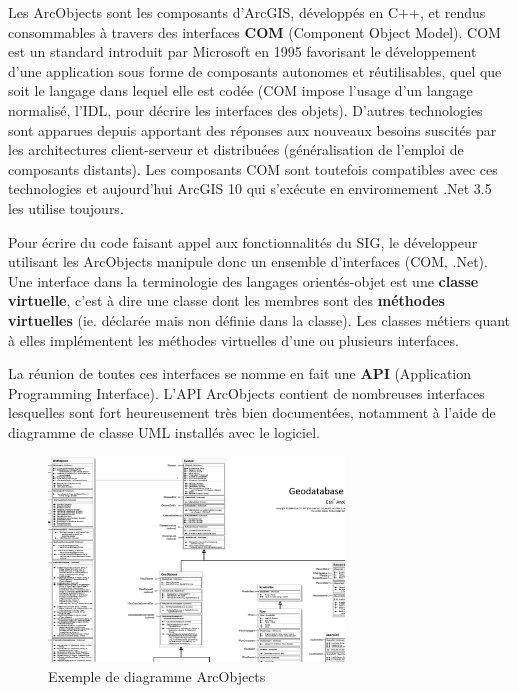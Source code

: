 \documentclass[11pt]{article}
\begin{document}
Les ArcObjects sont les composants d'ArcGIS, développés en C++, et rendus consommables à travers des interfaces \textbf{COM} (Component Object Model). COM est un standard introduit par Microsoft en 1995 favorisant le développement d'une application sous forme de composants autonomes et réutilisables, quel que soit le langage dans lequel elle est codée (COM impose l'usage d'un langage normalisé, l'IDL, pour décrire les interfaces des objets). D'autres technologies sont apparues depuis apportant des réponses aux nouveaux besoins suscités par les architectures client-serveur et distribuées (généralisation de l'emploi de composants distants). Les composants COM sont toutefois compatibles avec ces technologies et aujourd'hui ArcGIS 10 qui s'exécute en environnement .Net 3.5 les utilise toujours.

Pour écrire du code faisant appel aux fonctionnalités du SIG, le développeur utilisant les ArcObjects manipule donc un ensemble d'interfaces (COM, .Net). Une interface dans la terminologie des langages orientés-objet est une \textbf{classe virtuelle}, c'est à dire une classe dont les membres sont des \textbf{méthodes virtuelles} (ie. déclarée mais non définie dans la classe). Les classes métiers quant à elles implémentent les méthodes virtuelles d'une ou plusieurs interfaces.

La réunion de toutes ces interfaces se nomme en fait une \textbf{API} (Application Programming Interface). L'API ArcObjects contient de nombreuses interfaces lesquelles sont fort heureusement très bien documentées, notamment à l'aide de diagramme de classe UML installés avec le logiciel.

\begin{figure}[!h]
	\center \includegraphics[width=0.70\textwidth]{img/cours/api_arcobjects.png}
	\caption{Exemple de diagramme ArcObjects}
\end{figure}
\end{document}
